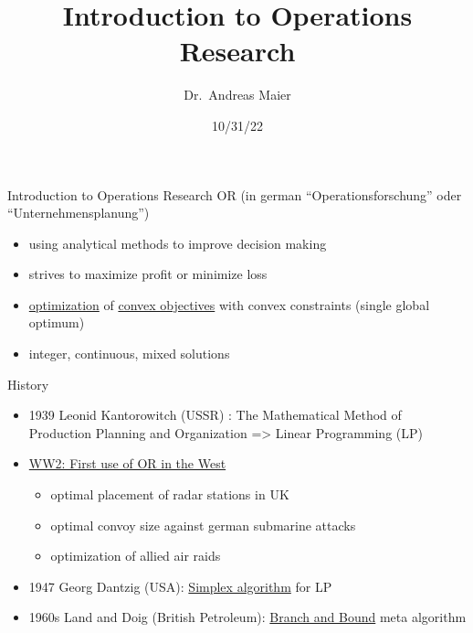 \documentclass[
  ignorenonframetext,
]{beamer}
\title{Introduction to Operations Research}
\author{Dr.~Andreas Maier}
\date{10/31/22}
\providecommand{\tightlist}{%
  \setlength{\itemsep}{0pt}\setlength{\parskip}{0pt}}\usepackage{longtable,booktabs,array}
\begin{document}
\frame{\titlepage}
\ifdefined\Shaded\renewenvironment{Shaded}{\begin{tcolorbox}[borderline west={3pt}{0pt}{shadecolor}, boxrule=0pt, enhanced, frame hidden, sharp corners, breakable, interior hidden]}{\end{tcolorbox}}\fi

\begin{frame}{Introduction to Operations Research}
\protect\hypertarget{introduction-to-operations-research}{}
OR (in german ``Operationsforschung'' oder ``Unternehmensplanung'')

\begin{itemize}
\tightlist
\item
  using analytical methods to improve decision making\\
\item
  strives to maximize profit or minimize loss
\item
  \href{https://en.wikipedia.org/wiki/Mathematical_optimization}{optimization}
  of \href{https://en.wikipedia.org/wiki/Convex_optimization}{convex
  objectives} with convex constraints (single global optimum)
\item
  integer, continuous, mixed solutions
\end{itemize}

\begin{block}{History}
\protect\hypertarget{history}{}
\begin{itemize}
\tightlist
\item
  1939 Leonid Kantorowitch (USSR) : The Mathematical Method of
  Production Planning and Organization =\textgreater{} Linear
  Programming (LP)
\item
  \href{https://en.wikipedia.org/wiki/Operations_research\#Second_World_War}{WW2:
  First use of OR in the West}

  \begin{itemize}
  \tightlist
  \item
    optimal placement of radar stations in UK
  \item
    optimal convoy size against german submarine attacks
  \item
    optimization of allied air raids
  \end{itemize}
\item
  1947 Georg Dantzig (USA):
  \href{https://en.wikipedia.org/wiki/Simplex_algorithm}{Simplex
  algorithm} for LP\\
\item
  1960s Land and Doig (British Petroleum):
  \href{https://en.wikipedia.org/wiki/Branch_and_bound}{Branch and
  Bound} meta algorithm
\end{itemize}
\end{block}


\end{frame}
\end{document}

